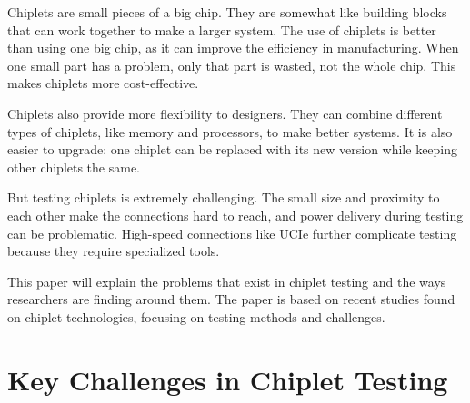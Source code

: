 \documentclass[acmtog, 12pt]{acmart}
\begin{document}

Chiplets are small pieces of a big chip. They are somewhat like building blocks that can work together to make a larger system. The use of chiplets is better than using one big chip, as it can improve the efficiency in manufacturing. When one small part has a problem, only that part is wasted, not the whole chip. This makes chiplets more cost-effective.

Chiplets also provide more flexibility to designers. They can combine different types of chiplets, like memory and processors, to make better systems. It is also easier to upgrade: one chiplet can be replaced with its new version while keeping other chiplets the same.

But testing chiplets is extremely challenging. The small size and proximity to each other make the connections hard to reach, and power delivery during testing can be problematic. High-speed connections like UCIe further complicate testing because they require specialized tools.

This paper will explain the problems that exist in chiplet testing and the ways researchers are finding around them. The paper is based on recent studies found on chiplet technologies, focusing on testing methods and challenges.


\section*{Key Challenges in Chiplet Testing}



\end{document}
